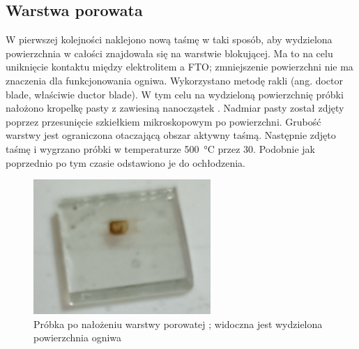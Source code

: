 \documentclass[a4, 12pt]{article}
\begin{document}
	\subsection{Warstwa porowata }
	W pierwszej kolejności naklejono nową taśmę w taki sposób, aby wydzielona powierzchnia w całości znajdowała się na warstwie blokującej. Ma to na celu uniknięcie kontaktu między elektrolitem a FTO; zmniejszenie powierzchni nie ma znaczenia dla funkcjonowania ogniwa. Wykorzystano metodę rakli (ang. doctor blade, właściwie ductor blade). W tym celu na wydzieloną powierzchnię próbki nałożono kropelkę pasty z zawiesiną nanocząstek . Nadmiar pasty został zdjęty poprzez przesunięcie szkiełkiem mikroskopowym po powierzchni. Grubość warstwy jest ograniczona otaczającą obszar aktywny taśmą. Następnie zdjęto taśmę i wygrzano próbki w temperaturze \qty{500}{\degreeCelsius} przez \qty{30}{\min}. Podobnie jak poprzednio po tym czasie odstawiono je do ochłodzenia. 
	\begin{figure}[H]
		\centering
		\includegraphics[width=0.6\textwidth]{probki_tio2_poro.png}
		\caption{Próbka po nałożeniu warstwy porowatej ; widoczna jest wydzielona powierzchnia ogniwa}
	\end{figure}
	
\end{document}
